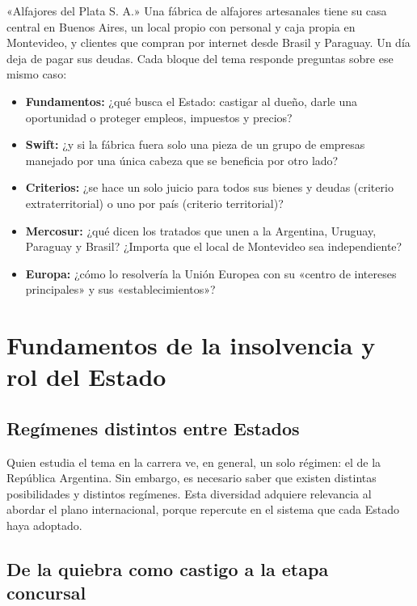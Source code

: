 \documentclass[12pt,oneside]{book}
\begin{document}
\begin{example}{«Alfajores del Plata S. A.»}
Una fábrica de alfajores artesanales tiene su casa central en Buenos Aires, un local propio con personal y caja propia en Montevideo, y clientes que compran por internet desde Brasil y Paraguay. Un día deja de pagar sus deudas. Cada bloque del tema responde preguntas sobre ese mismo caso:
\begin{itemize}
    \item \textbf{Fundamentos:} ¿qué busca el Estado: castigar al dueño, darle una oportunidad o proteger empleos, impuestos y precios?
    \item \textbf{Swift:} ¿y si la fábrica fuera solo una pieza de un grupo de empresas manejado por una única cabeza que se beneficia por otro lado?
    \item \textbf{Criterios:} ¿se hace un solo juicio para todos sus bienes y deudas (criterio extraterritorial) o uno por país (criterio territorial)?
    \item \textbf{Mercosur:} ¿qué dicen los tratados que unen a la Argentina, Uruguay, Paraguay y Brasil? ¿Importa que el local de Montevideo sea independiente?
    \item \textbf{Europa:} ¿cómo lo resolvería la Unión Europea con su «centro de intereses principales» y sus «establecimientos»?
\end{itemize}
\end{example}

\chapter[Fundamentos de la insolvencia]{Fundamentos de la insolvencia y rol del Estado}

\section{Regímenes distintos entre Estados}

Quien estudia el tema en la carrera ve, en general, un solo régimen: el de la República Argentina. Sin embargo, es necesario saber que existen distintas posibilidades y distintos regímenes. Esta diversidad adquiere relevancia al abordar el plano internacional, porque repercute en el sistema que cada Estado haya adoptado.

\section{De la quiebra como castigo a la etapa concursal}
\end{document}
